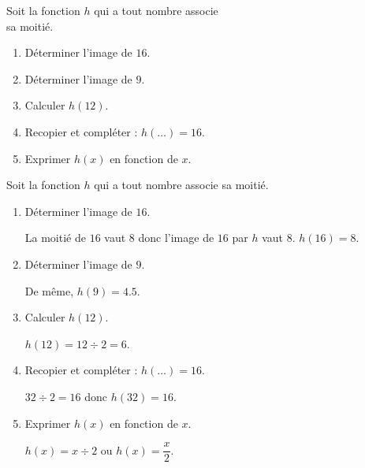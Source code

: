 \begin{exercice}
    Soit la fonction $h$ qui a tout nombre associe\\ sa moitié.
    \begin{enumerate}
        \item Déterminer l'image de $16$.
        \item Déterminer l'image de $9$.
        \item Calculer $h(12)$.
        \item Recopier et compléter : $h(\dots{})=16$.
        \item Exprimer $h(x)$ en fonction de $x$.
    \end{enumerate}
\end{exercice}
\begin{corrige}
    Soit la fonction $h$ qui a tout nombre associe sa moitié.

    \begin{enumerate}
        \item Déterminer l'image de $16$.
        
        {\red La moitié de $16$ vaut $8$ donc l'image de $16$ par $h$ vaut $8$. $h(16)=8$.}
        \item Déterminer l'image de $9$.
        
        {\red De même, $h(9)=\num{4.5}$.}
        \item Calculer $h(12)$.
        
        {\red $h(12)=12\div 2 = 6$.}
        \item Recopier et compléter : $h(\dots{})=16$.
        
        {\red $32\div 2 = 16$ donc $h(32)=16$.}
        \item Exprimer $h(x)$ en fonction de $x$.
        
        {\red $h(x) = x\div 2$ ou $h(x)=\dfrac{x}{2}$.}
    \end{enumerate}
\end{corrige}

